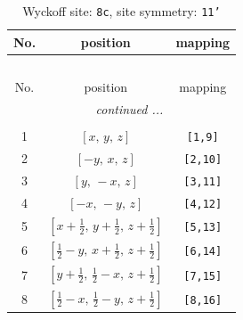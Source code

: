 \documentclass[fleqn,8pt]{jsarticle}
\begin{document}
\renewcommand{\arraystretch}{1.2}
\begin{longtable}{ccc}
\caption{Wyckoff site: {\tt 8c}, site symmetry: {\tt 11'}}
 \\
 \hline \hline
No. & position & mapping \\ \hline \endfirsthead

\multicolumn{2}{l}{\tablename\ \thetable{}} \\
 \hline \hline
No. & position & mapping \\ \hline \endhead

 \hline \hline
\multicolumn{2}{r}{\footnotesize\it continued ...} \\ \endfoot

 \hline \hline
\multicolumn{2}{r}{} \\ \endlastfoot

1 & $\left[ x,\, y,\, z \right]$ & {\tt [1,9]} \\ \hline
2 & $\left[ - y,\, x,\, z \right]$ & {\tt [2,10]} \\ \hline
3 & $\left[ y,\, - x,\, z \right]$ & {\tt [3,11]} \\ \hline
4 & $\left[ - x,\, - y,\, z \right]$ & {\tt [4,12]} \\ \hline
5 & $\left[ x + \frac{1}{2},\, y + \frac{1}{2},\, z + \frac{1}{2} \right]$ & {\tt [5,13]} \\ \hline
6 & $\left[ \frac{1}{2} - y,\, x + \frac{1}{2},\, z + \frac{1}{2} \right]$ & {\tt [6,14]} \\ \hline
7 & $\left[ y + \frac{1}{2},\, \frac{1}{2} - x,\, z + \frac{1}{2} \right]$ & {\tt [7,15]} \\ \hline
8 & $\left[ \frac{1}{2} - x,\, \frac{1}{2} - y,\, z + \frac{1}{2} \right]$ & {\tt [8,16]} \\
\end{longtable}
\end{document}

